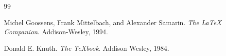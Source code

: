 \begin{thebibliography}{99}

Michel Goossens, Frank Mittelbach, and Alexander Samarin.
\newblock \emph{The LaTeX Companion}.
\newblock Addison-Wesley, 1994.

Donald E. Knuth.
\newblock \emph{The TeXbook}.
\newblock Addison-Wesley, 1984.

\end{thebibliography}

